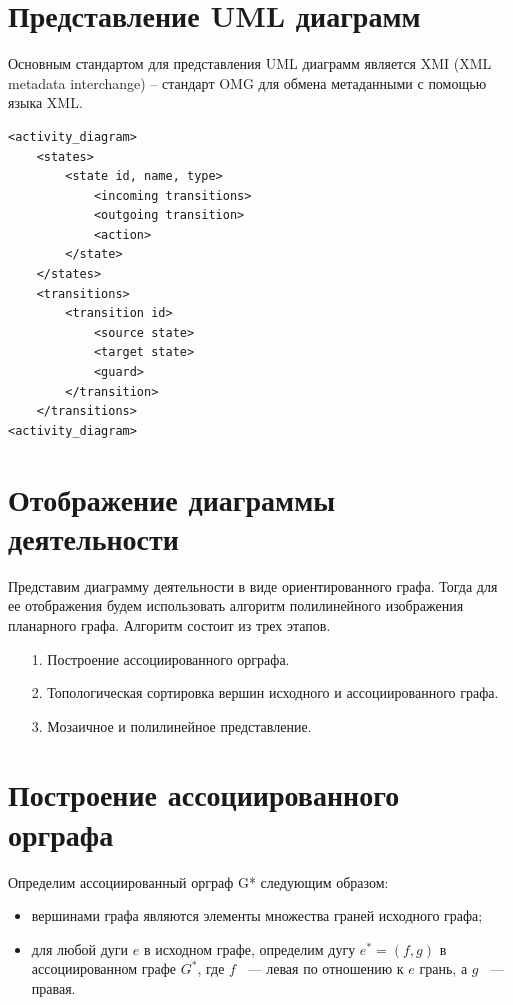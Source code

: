\documentclass[12pt]{article}
\begin{document}
\section{Представление UML диаграмм }

\begin{minipage}[H]{0.4\linewidth}
Основным стандартом для представления UML диаграмм является XMI (XML metadata interchange) – стандарт OMG для обмена метаданными с помощью языка XML.
\end{minipage}
\hfill
\begin{minipage}[H]{0.60\linewidth}
	\begin{small}
		\begin{verbatim}
<activity_diagram>
    <states>
        <state id, name, type>
            <incoming transitions>
            <outgoing transition>
            <action>
        </state>
    </states>
    <transitions>
        <transition id>
            <source state>
            <target state>
            <guard>
        </transition>
    </transitions>
<activity_diagram>
		\end{verbatim}
	\end{small}
\end{minipage}

\section{Отображение диаграммы деятельности }

Представим диаграмму деятельности в виде ориентированного графа. Тогда для ее отображения будем использовать алгоритм полилинейного изображения планарного графа. Алгоритм состоит из трех этапов.
\begin{enumerate}
\item[1.] Построение ассоциированного орграфа.
\item[2.] Топологическая сортировка вершин исходного и ассоциированного графа.
\item[3.] Мозаичное и полилинейное представление.
\end{enumerate}

\section{Построение ассоциированного орграфа}

Определим ассоциированный орграф G* следующим образом:
\begin{itemize}
\item вершинами графа являются элементы множества граней исходного графа;
\item для любой дуги $ e $ в исходном графе, определим дугу $ e^{*} = (f, g) $ в ассоциированном графе $ G^{*} $, где $ f $ ~--- левая по отношению к $ e $ грань, а $ g $ ~--- правая.
\end{itemize}
\end{document}
